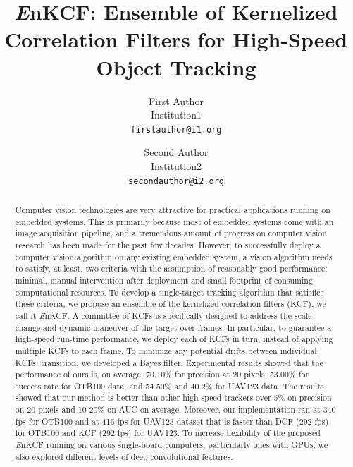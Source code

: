 \documentclass[10pt,twocolumn,letterpaper]{article}
\begin{document}
\title{{\it E}nKCF: Ensemble of Kernelized Correlation Filters for
  High-Speed Object Tracking}

\author{First Author \\
Institution1\\
{\tt\small firstauthor@i1.org}
\and
Second Author \\
Institution2\\
{\tt\small secondauthor@i2.org}
}

\maketitle
\ifwacvfinal\thispagestyle{empty}\fi

\begin{abstract}
Computer vision technologies are very attractive for practical
applications running on embedded systems. This is primarily because
most of embedded systems come with an image acquisition pipeline, and
a tremendous amount of progress on computer vision research has been
made for the past few decades. However, to successfully deploy a
computer vision algorithm on any existing embedded system, a vision
algorithm needs to satisfy, at least, two criteria with the assumption
of reasonably good performance: minimal, manual intervention after
deployment and small footprint of consuming computational
resources. To develop a single-target tracking algorithm that
satisfies these criteria, we propose an ensemble of the kernelized
correlation filters (KCF), we call it {\it E}nKCF. A committee of KCFs
is specifically designed to address the scale-change and dynamic
maneuver of the target over frames. In particular, to guarantee a
high-speed run-time performance, we deploy each of KCFs in turn,
instead of applying multiple KCFs to each frame. To minimize any
potential drifts between individual KCFs' transition, we developed a
Bayes filter. Experimental results showed that the performance of ours
is, on average, 70.10\% for precision at 20 pixels, 53.00\% for
success rate for OTB100 data, and 54.50\% and 40.2\% for UAV123
data. The results showed that our method is better than other
high-speed trackers over 5\% on precision on 20 pixels and 10-20\% on
AUC on average. Moreover, our implementation ran at 340 fps for OTB100
and at 416 fps for UAV123 dataset that is faster than DCF (292 fps)
for OTB100 and KCF (292 fps) for UAV123. To increase flexibility of
the proposed {\it E}nKCF running on various single-board computers,
particularly ones with GPUs, we also explored different levels of deep
convolutional features.
\end{abstract}
\end{document}
